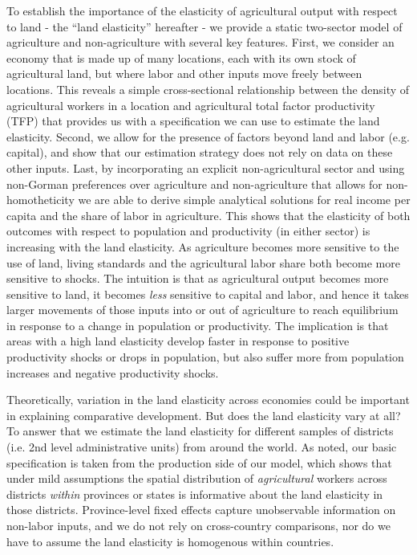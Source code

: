 To establish the importance of the elasticity of agricultural output with respect to land - the ``land elasticity'' hereafter - we provide a static two-sector model of agriculture and non-agriculture with several key features. First, we consider an economy that is made up of many locations, each with its own stock of agricultural land, but where labor and other inputs move freely between locations. This reveals a simple cross-sectional relationship between the density of agricultural workers in a location and agricultural total factor productivity (TFP) that provides us with a specification we can use to estimate the land elasticity. Second, we allow for the presence of factors beyond land and labor (e.g. capital), and show that our estimation strategy does not rely on data on these other inputs. Last, by incorporating an explicit non-agricultural sector and using non-Gorman preferences over agriculture and non-agriculture that allows for non-homotheticity \citep{boppart2014} we are able to derive simple analytical solutions for real income per capita and the share of labor in agriculture. This shows that the elasticity of both outcomes with respect to population and productivity (in either sector) is increasing with the land elasticity. As agriculture becomes more sensitive to the use of land, living standards and the agricultural labor share both become more sensitive to shocks. The intuition is that as agricultural output becomes more sensitive to land, it becomes \textit{less} sensitive to capital and labor, and hence it takes larger movements of those inputs into or out of agriculture to reach equilibrium in response to a change in population or productivity. The implication is that areas with a high land elasticity develop faster in response to positive productivity shocks or drops in population, but also suffer more from population increases and negative productivity shocks.

Theoretically, variation in the land elasticity across economies could be important in explaining comparative development. But does the land elasticity vary at all? To answer that we estimate the land elasticity for different samples of districts (i.e. 2nd level administrative units) from around the world. As noted, our basic specification is taken from the production side of our model, which shows that under mild assumptions the spatial distribution of \textit{agricultural} workers across districts \textit{within} provinces or states is informative about the land elasticity in those districts. Province-level fixed effects capture unobservable information on non-labor inputs, and we do not rely on cross-country comparisons, nor do we have to assume the land elasticity is homogenous within countries. 

